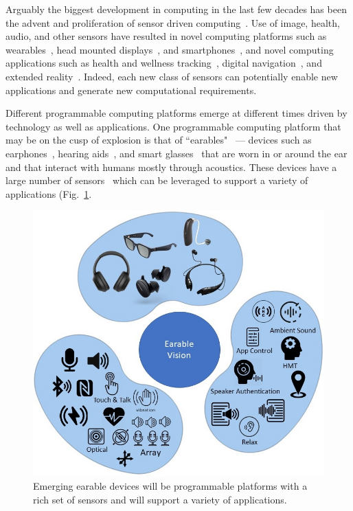 Arguably the biggest development in computing in the last few decades has been
the advent and proliferation of sensor driven
computing~\cite{krishnamurthi_overview_2020}.  Use of image, health, audio, and
other sensors have resulted in novel computing platforms such as
wearables~\cite{shamma2007watch}, head mounted
displays~\cite{jensen2018review}, and smartphones~\cite{smith2013smartphone},
and novel computing applications such as health and wellness
tracking~\cite{alslaity2022mobile}, digital navigation~\cite{vvcelak2005amr},
and extended reality~\cite{huzaifa2020exploring}. Indeed, each new class of
sensors can potentially enable new applications and generate new computational
requirements.

Different programmable computing platforms emerge at different times driven by
technology as well as applications. One programmable computing platform that
may be on the cusp of explosion is that of ``earables"~\cite{} --- devices
such as earphones~\cite{}, hearing aids~\cite{}, and smart glasses~\cite{} that
are worn in or around the ear and that interact with humans mostly through
acoustics.  These devices have a large number of sensors~\cite{} which can be
leveraged to support a variety of applications (Fig.~\ref{fig:earable_vision}.

\begin{figure}
    \centering
    \includegraphics[width=\linewidth]{figs/vision_3.jpg}
    \caption{\small
        Emerging earable devices will be programmable platforms with a rich set
        of sensors and will support a variety of applications.
    }
    \label{fig:earable_vision}
\end{figure}

